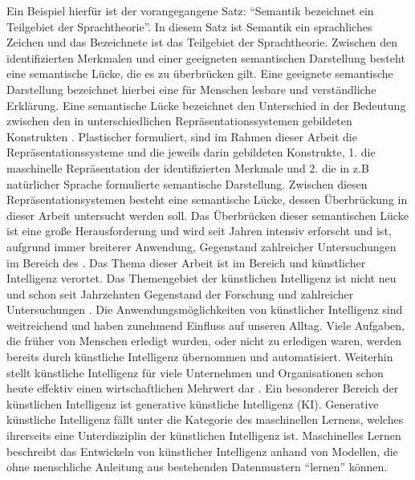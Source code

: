 Ein Beispiel hierfür ist der vorangegangene Satz: \enquote{Semantik bezeichnet ein Teilgebiet der Sprachtheorie}. In diesem Satz ist Semantik ein sprachliches Zeichen und das Bezeichnete ist das Teilgebiet der Sprachtheorie.
Zwischen den identifizierten Merkmalen und einer geeigneten semantischen Darstellung besteht eine semantische Lücke, die es zu überbrücken gilt.
Eine geeignete semantische Darstellung bezeichnet hierbei eine für Menschen lesbare und verständliche Erklärung.
\newline
Eine semantische Lücke bezeichnet den Unterschied in der Bedeutung zwischen den in unterschiedlichen Repräsentationssystemen gebildeten Konstrukten \cite{semantic-gap-def}.
\newline
Plastischer formuliert, sind im Rahmen dieser Arbeit die Repräsentationssysteme und die jeweils darin gebildeten Konstrukte, 1. die maschinelle Repräsentation der identifizierten Merkmale und 2. die in z.B natürlicher Sprache formulierte semantische Darstellung.
Zwischen diesen Repräsentationsystemen besteht eine semantische Lücke, dessen Überbrückung in dieser Arbeit untersucht werden soll.
\newline
Das Überbrücken dieser semantischen Lücke ist eine große Herausforderung und wird seit Jahren intensiv erforscht und ist, aufgrund immer breiterer Anwendung, Gegenstand zahlreicher Untersuchungen im Bereich des \mmiri{} \cite{bridging-semantic-gap}.
\med
Das Thema dieser Arbeit ist im Bereich \mmir{} und künstlicher Intelligenz verortet.
Das Themengebiet der künstlichen Intelligenz ist nicht neu und schon seit Jahrzehnten Gegenstand der Forschung und zahlreicher Untersuchungen \cite{harvard-history-ai-research}.
Die Anwendungsmöglichkeiten von künstlicher Intelligenz sind weitreichend und haben zunehmend Einfluss auf unseren Alltag. 
Viele Aufgaben, die früher von Menschen erledigt wurden, oder nicht zu erledigen waren, werden bereits durch künstliche Intelligenz übernommen und automatisiert. 
Weiterhin stellt künstliche Intelligenz für viele Unternehmen und Organisationen schon heute effektiv einen wirtschaftlichen Mehrwert dar \cite{ai-anwendungsbereiche}.
\newline
Ein besonderer Bereich der künstlichen Intelligenz ist generative künstliche Intelligenz (KI).
Generative künstliche Intelligenz fällt unter die Kategorie des maschinellen Lernens, welches ihrerseits eine Unterdisziplin der künstlichen Intelligenz ist.
Maschinelles Lernen beschreibt das Entwickeln von künstlicher Intelligenz anhand von Modellen, die ohne menschliche Anleitung aus bestehenden Datenmustern \enquote{lernen} können.
